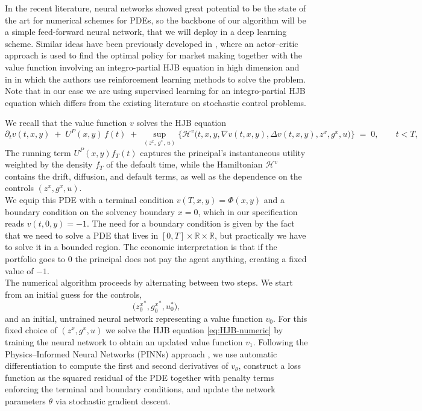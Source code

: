 \documentclass[11pt,a4paper]{article}
\theoremstyle{thmstyleone}%
\theoremstyle{thmstyletwo}%
\theoremstyle{thmstylethree}%
\newcommand{\R}{\mathbb{R}}
\begin{document}
In the recent literature, neural networks showed great potential to be the state of the art for numerical schemes for PDEs, so the backbone of our algorithm will be a simple feed-forward neural network, that we will deploy in a deep learning scheme. Similar ideas have been previously developed in \cite{baldacci2019market}, where an actor--critic approach is used to find the optimal policy for market making together with the value function involving an integro-partial HJB equation in high dimension and in \cite{lu2025multiagent} in which the authors use reinforcement learning methods to solve the problem. Note that in our case we are using supervised learning for an integro-partial HJB equation which differs from the existing literature on stochastic control problems.


We recall that the value function $v$ solves the HJB equation
\begin{equation}\label{eq:HJB-numeric}
    \partial_t v(t,x,y)
    \;+\;
    U^P(x,y)\, f(t)
    \;+\;
    \sup_{(z^x,\,g^x,\,u)}
    \Big\{
        \mathcal{H}^v\bigl(
            t,x,y,\nabla v(t,x,y),\Delta v(t,x,y),
            z^x,g^x,u
        \bigr)
    \Big\}
    \;=\; 0,
    \qquad t < T,
\end{equation}
The running term $U^P(x,y) f_T(t)$ captures the principal's instantaneous utility weighted by the density $f_T$ of the default time, while the Hamiltonian $\mathcal{H}^v$ contains the drift, diffusion, and default terms, as well as the dependence on the controls $(z^x,g^x,u)$.\\ 
We equip this PDE with a terminal condition $v(T,x,y)=\Phi(x,y)$ and a boundary condition on the solvency boundary $x=0$, which in our specification reads $v(t,0,y) = -1$. The need for a boundary condition is given by the fact that we need to solve a PDE that lives in $[0, T] \times \R \times \R$, but practically we have to solve it in a bounded region. The economic interpretation is that if the portfolio goes to $0$ the principal does not pay the agent anything, creating a fixed value of $-1$. \\
The numerical algorithm proceeds by alternating between two steps. We start from an initial guess for the controls,
\[
    \bigl( {z_0^x}^*, {g_0^x}^*, u_0^* \bigr),
\]
and an initial, untrained neural network representing a value function $v_0$. For this fixed choice of $(z^x,g^x,u)$ we solve the HJB equation \eqref{eq:HJB-numeric} by training the neural network to obtain an updated value function $v_1$. Following the Physics--Informed Neural Networks (PINNs) approach \cite{raissi2017physics}, we use automatic differentiation to compute the first and second derivatives of $v_\theta$, construct a loss function as the squared residual of the PDE together with penalty terms enforcing the terminal and boundary conditions, and update the network parameters $\theta$ via stochastic gradient descent.\\
\end{document}
